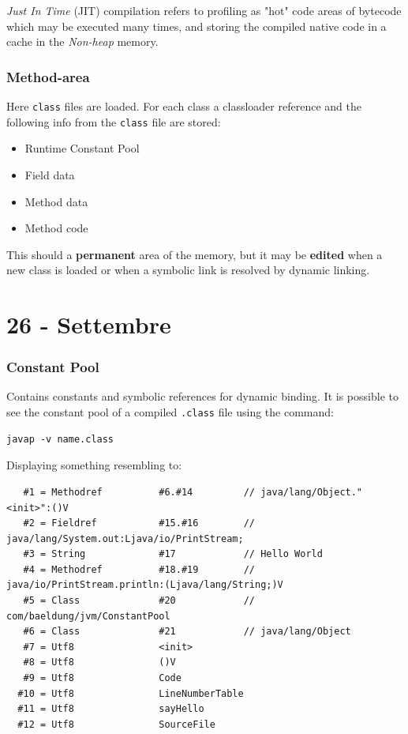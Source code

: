 \textit{Just In Time} (JIT) compilation refers to profiling as "hot" code areas of bytecode which may be executed many times, and storing the compiled native code in a cache in the \textit{Non-heap} memory.

\subsubsection{Method-area}
Here \lstinline{class} files are loaded.
For each class a classloader reference and the following info from the \lstinline{class} file are stored:
\begin{itemize}
    \item Runtime Constant Pool
    \item Field data
    \item Method data
    \item Method code
\end{itemize}


This should a \textbf{permanent} area of the memory, but it may be \textbf{edited} when a new class is loaded or when a symbolic link is resolved by dynamic linking.


\section*{26 - Settembre}
\subsubsection{Constant Pool}
Contains constants and symbolic references for dynamic binding.
It is possible to see the constant pool of a compiled \lstinline{.class} file using the command:
\begin{lstlisting}
javap -v name.class
\end{lstlisting}
Displaying something resembling to:
\begin{lstlisting}
   #1 = Methodref          #6.#14         // java/lang/Object."<init>":()V
   #2 = Fieldref           #15.#16        // java/lang/System.out:Ljava/io/PrintStream;
   #3 = String             #17            // Hello World
   #4 = Methodref          #18.#19        // java/io/PrintStream.println:(Ljava/lang/String;)V
   #5 = Class              #20            // com/baeldung/jvm/ConstantPool
   #6 = Class              #21            // java/lang/Object
   #7 = Utf8               <init>
   #8 = Utf8               ()V
   #9 = Utf8               Code
  #10 = Utf8               LineNumberTable
  #11 = Utf8               sayHello
  #12 = Utf8               SourceFile
\end{lstlisting}

